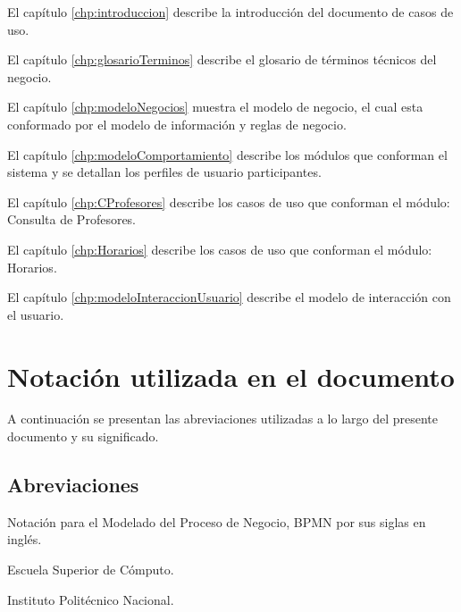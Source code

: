 	\begin{Citemize}
		
		\item El capítulo \ref{chp:introduccion} describe la introducción del documento de casos de uso.
		
		\item El capítulo \ref{chp:glosarioTerminos} describe el glosario de términos técnicos del negocio.
		
		\item El capítulo \ref{chp:modeloNegocios}  muestra el modelo de negocio, el cual esta conformado por el modelo de información y reglas de negocio.
		
		\item El capítulo \ref{chp:modeloComportamiento} describe los módulos que conforman el sistema y se detallan los perfiles de usuario participantes.
		
		\item El capítulo \ref{chp:CProfesores} describe los casos de uso que conforman el módulo: Consulta de Profesores.
		
		\item El capítulo \ref{chp:Horarios} describe los casos de uso que conforman el módulo: Horarios.
		
		\item El capítulo \ref{chp:modeloInteraccionUsuario} describe el modelo de interacción con el usuario.
		
	\end{Citemize}

\section{Notación utilizada en el documento}\label{sec:notacion}

A continuación se presentan las abreviaciones utilizadas a lo largo del presente documento y su significado.

\subsection{Abreviaciones}\label{ssec:abreviaciones}

	\begin{description}

	 Notación para el Modelado del Proceso de Negocio, BPMN por sus siglas en inglés.

	 Escuela Superior de Cómputo. 
	
	 Instituto Politécnico Nacional.

	\end{description}

